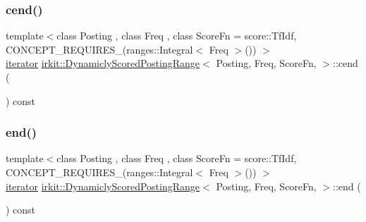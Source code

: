 \subsubsection{\texorpdfstring{cend()}{cend()}}
{\footnotesize\ttfamily template$<$class Posting , class Freq , class Score\+Fn  = score\+::\+Tf\+Idf, C\+O\+N\+C\+E\+P\+T\+\_\+\+R\+E\+Q\+U\+I\+R\+E\+S\+\_\+(ranges\+::\+Integral$<$ Freq $>$()) $>$ \\
\mbox{\hyperlink{classirkit_1_1DynamiclyScoredPostingRange_1_1iterator}{iterator}} \mbox{\hyperlink{classirkit_1_1DynamiclyScoredPostingRange}{irkit\+::\+Dynamicly\+Scored\+Posting\+Range}}$<$ Posting, Freq, Score\+Fn, $>$\+::cend (\begin{DoxyParamCaption}{ }\end{DoxyParamCaption}) const\hspace{0.3cm}{\ttfamily [inline]}}

\mbox{\label{classirkit_1_1DynamiclyScoredPostingRange_a6d0857abfae0edcf8a2c5d63916dfbb1}} 
\subsubsection{\texorpdfstring{end()}{end()}}
{\footnotesize\ttfamily template$<$class Posting , class Freq , class Score\+Fn  = score\+::\+Tf\+Idf, C\+O\+N\+C\+E\+P\+T\+\_\+\+R\+E\+Q\+U\+I\+R\+E\+S\+\_\+(ranges\+::\+Integral$<$ Freq $>$()) $>$ \\
\mbox{\hyperlink{classirkit_1_1DynamiclyScoredPostingRange_1_1iterator}{iterator}} \mbox{\hyperlink{classirkit_1_1DynamiclyScoredPostingRange}{irkit\+::\+Dynamicly\+Scored\+Posting\+Range}}$<$ Posting, Freq, Score\+Fn, $>$\+::end (\begin{DoxyParamCaption}{ }\end{DoxyParamCaption}) const\hspace{0.3cm}{\ttfamily [inline]}}

\mbox{\label{classirkit_1_1DynamiclyScoredPostingRange_a3a080b946216c0caf02eb9749c8e2e2e}} 
